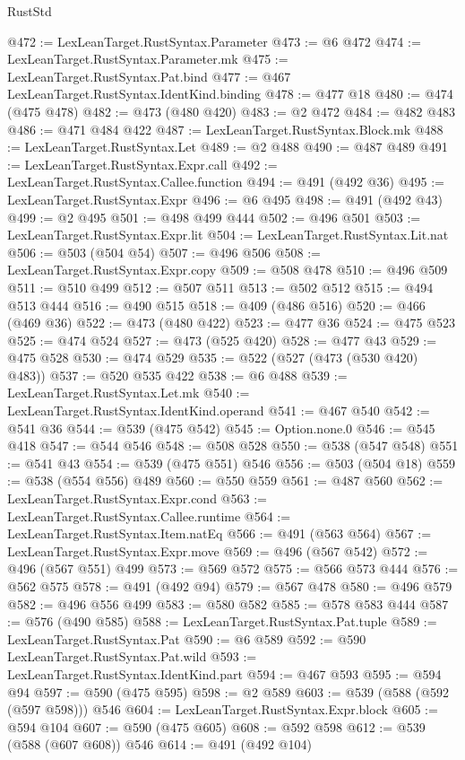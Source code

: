 \begin{lexlean}{RustStd}
\begin{coremodule}
{\begin{coremodule}
{{{{{{{{{{{@472 := LexLeanTarget.RustSyntax.Parameter
@473 := @6 @472
@474 := LexLeanTarget.RustSyntax.Parameter.mk
@475 := LexLeanTarget.RustSyntax.Pat.bind
@477 := @467 LexLeanTarget.RustSyntax.IdentKind.binding
@478 := @477 @18
@480 := @474 (@475 @478)
@482 := @473 (@480 @420)
@483 := @2 @472
@484 := @482 @483
@486 := @471 @484 @422
@487 := LexLeanTarget.RustSyntax.Block.mk
@488 := LexLeanTarget.RustSyntax.Let
@489 := @2 @488
@490 := @487 @489
@491 := LexLeanTarget.RustSyntax.Expr.call
@492 := LexLeanTarget.RustSyntax.Callee.function
@494 := @491 (@492 @36)
@495 := LexLeanTarget.RustSyntax.Expr
@496 := @6 @495
@498 := @491 (@492 @43)
@499 := @2 @495
@501 := @498 @499 @444
@502 := @496 @501
@503 := LexLeanTarget.RustSyntax.Expr.lit
@504 := LexLeanTarget.RustSyntax.Lit.nat
@506 := @503 (@504 @54)
@507 := @496 @506
@508 := LexLeanTarget.RustSyntax.Expr.copy
@509 := @508 @478
@510 := @496 @509
@511 := @510 @499
@512 := @507 @511
@513 := @502 @512
@515 := @494 @513 @444
@516 := @490 @515
@518 := @409 (@486 @516)
@520 := @466 (@469 @36)
@522 := @473 (@480 @422)
@523 := @477 @36
@524 := @475 @523
@525 := @474 @524
@527 := @473 (@525 @420)
@528 := @477 @43
@529 := @475 @528
@530 := @474 @529
@535 := @522 (@527 (@473 (@530 @420) @483))
@537 := @520 @535 @422
@538 := @6 @488
@539 := LexLeanTarget.RustSyntax.Let.mk
@540 := LexLeanTarget.RustSyntax.IdentKind.operand
@541 := @467 @540
@542 := @541 @36
@544 := @539 (@475 @542)
@545 := Option.none.{0}
@546 := @545 @418
@547 := @544 @546
@548 := @508 @528
@550 := @538 (@547 @548)
@551 := @541 @43
@554 := @539 (@475 @551) @546
@556 := @503 (@504 @18)
@559 := @538 (@554 @556) @489
@560 := @550 @559
@561 := @487 @560
@562 := LexLeanTarget.RustSyntax.Expr.cond
@563 := LexLeanTarget.RustSyntax.Callee.runtime
@564 := LexLeanTarget.RustSyntax.Item.natEq
@566 := @491 (@563 @564)
@567 := LexLeanTarget.RustSyntax.Expr.move
@569 := @496 (@567 @542)
@572 := @496 (@567 @551) @499
@573 := @569 @572
@575 := @566 @573 @444
@576 := @562 @575
@578 := @491 (@492 @94)
@579 := @567 @478
@580 := @496 @579
@582 := @496 @556 @499
@583 := @580 @582
@585 := @578 @583 @444
@587 := @576 (@490 @585)
@588 := LexLeanTarget.RustSyntax.Pat.tuple
@589 := LexLeanTarget.RustSyntax.Pat
@590 := @6 @589
@592 := @590 LexLeanTarget.RustSyntax.Pat.wild
@593 := LexLeanTarget.RustSyntax.IdentKind.part
@594 := @467 @593
@595 := @594 @94
@597 := @590 (@475 @595)
@598 := @2 @589
@603 := @539 (@588 (@592 (@597 @598))) @546
@604 := LexLeanTarget.RustSyntax.Expr.block
@605 := @594 @104
@607 := @590 (@475 @605)
@608 := @592 @598
@612 := @539 (@588 (@607 @608)) @546
@614 := @491 (@492 @104)
}}}}}}}}}}}
\end{coremodule}}
\end{coremodule}
\end{lexlean}
